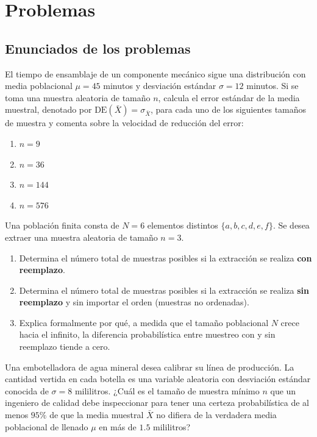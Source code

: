 \section*{Problemas}

\subsection*{Enunciados de los problemas}

\begin{problema}
	\label{prob:c0cebb4}
	El tiempo de ensamblaje de un componente mecánico sigue una distribución con media poblacional $\mu = 45$ minutos y desviación estándar $\sigma = 12$ minutos. Si se toma una muestra aleatoria de tamaño $n$, calcula el error estándar de la media muestral, denotado por $\text{DE}(\bar{X}) = \sigma_{\bar{X}}$, para cada uno de los siguientes tamaños de muestra y comenta sobre la velocidad de reducción del error:
	\begin{enumerate}
		\item $n = 9$
		\item $n = 36$
		\item $n = 144$
		\item $n = 576$
	\end{enumerate}
\end{problema}

\begin{problema}
	\label{prob:116017b}
	Una población finita consta de $N = 6$ elementos distintos $\{a, b, c, d, e, f\}$. Se desea extraer una muestra aleatoria de tamaño $n = 3$.
	\begin{enumerate}
		\item Determina el número total de muestras posibles si la extracción se realiza \textbf{con reemplazo}.
		\item Determina el número total de muestras posibles si la extracción se realiza \textbf{sin reemplazo} y sin importar el orden (muestras no ordenadas).
		\item Explica formalmente por qué, a medida que el tamaño poblacional $N$ crece hacia el infinito, la diferencia probabilística entre muestreo con y sin reemplazo tiende a cero.
	\end{enumerate}
\end{problema}

\begin{problema}
	\label{prob:2da8cc3}
	Una embotelladora de agua mineral desea calibrar su línea de producción. La cantidad vertida en cada botella es una variable aleatoria con desviación estándar conocida de $\sigma = 8$ mililitros. ¿Cuál es el tamaño de muestra mínimo $n$ que un ingeniero de calidad debe inspeccionar para tener una certeza probabilística de al menos $95\%$ de que la media muestral $\bar{X}$ no difiera de la verdadera media poblacional de llenado $\mu$ en más de $1.5$ mililitros?
\end{problema}

